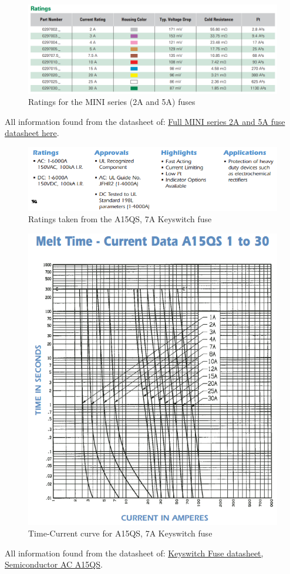 \documentclass{article}
\begin{document}
\begin{figure}[H]
    \centering
    \includegraphics[width = 0.4 \textwidth]{mini_ratings}
    \caption{Ratings for the MINI series (2A and 5A) fuses}
    \label{MINIratings}
\end{figure}

All information found from the datasheet of:
\href{http://www.littelfuse.com/~/media/automotive/datasheets/fuses/automotive-fuses/littelfuse_automotive_blade_fuse_mini_32v.pdf}{Full MINI series 2A and 5A fuse datasheet here}.

\begin{figure}[H]
    \centering
    \includegraphics[width = 0.5 \textwidth]{Keyswitchratings}
    \caption{Ratings taken from the A15QS, 7A Keyswitch fuse}
    \label{keyswitchratings}
\end{figure}

\begin{figure}
    \centering
    \includegraphics[width = 0.5 \textwidth]{Keyswitchmeltingtime}
    \caption{Time-Current curve for A15QS, 7A Keyswitch fuse}
    \label{keyswitchcurve}
\end{figure}

All information found from the datasheet of:
\href{http://www.allfuses.com/media/documents/Ferraz%20A15QS.pdf}{Keyswitch Fuse datasheet, Semiconductor AC A15QS}.
\end{document}
